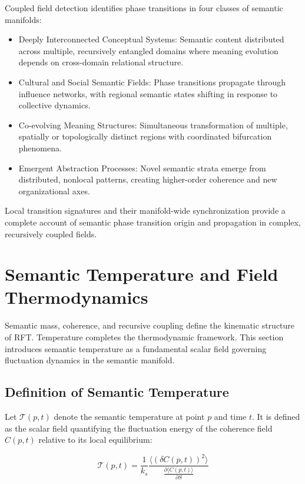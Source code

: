 Coupled field detection identifies phase transitions in four classes of semantic manifolds:

\begin{itemize}
    \item Deeply Interconnected Conceptual Systems: Semantic content distributed across multiple, recursively entangled domains where meaning evolution depends on cross-domain relational structure.
    \item Cultural and Social Semantic Fields: Phase transitions propagate through influence networks, with regional semantic states shifting in response to collective dynamics.
    \item Co-evolving Meaning Structures: Simultaneous transformation of multiple, spatially or topologically distinct regions with coordinated bifurcation phenomena.
    \item Emergent Abstraction Processes: Novel semantic strata emerge from distributed, nonlocal patterns, creating higher-order coherence and new organizational axes.
\end{itemize}

Local transition signatures and their manifold-wide synchronization provide a complete account of semantic phase transition origin and propagation in complex, recursively coupled fields.

\section{Semantic Temperature and Field Thermodynamics}

Semantic mass, coherence, and recursive coupling define the kinematic structure of RFT. Temperature completes the thermodynamic framework. This section introduces semantic temperature as a fundamental scalar field governing fluctuation dynamics in the semantic manifold.

\subsection{Definition of Semantic Temperature}

Let \(\mathcal{T}(p,t)\) denote the semantic temperature at point \(p\) and time \(t\). It is defined as the scalar field quantifying the fluctuation energy of the coherence field \(C(p,t)\) relative to its local equilibrium:

\begin{equation}
\mathcal{T}(p,t) = \frac{1}{k_s} \frac{\langle (\delta C(p,t))^2 \rangle}{\frac{\partial \langle C(p,t) \rangle}{\partial S}}
\end{equation}

